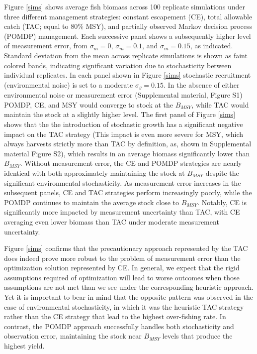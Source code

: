 \documentclass[3p]{elsarticle} %
\begin{document}
Figure \ref{sims} shows average fish biomass across 100 replicate
simulations under three different management strategies: constant
escapement (CE), total allowable catch (TAC; equal to 80\% MSY), and
partially observed Markov decision process (POMDP) management. Each
successive panel shows a subsequently higher level of measurement error,
from \(\sigma_m = 0\), \(\sigma_m = 0.1\), and \(\sigma_m = 0.15\), as
indicated. Standard deviation from the mean across replicate simulations
is shown as faint colored bands, indicating significant variation due to
stochasticity between individual replicates. In each panel shown in
Figure \ref{sims} stochastic recruitment (environmental noise) is set to
a moderate \(\sigma_g = 0.15\). In the absence of either environmental
noise or measurement error (Supplemental material, Figure S1) POMDP, CE,
and MSY would converge to stock at the \(B_{MSY}\), while TAC would
maintain the stock at a slightly higher level. The first panel of Figure
\ref{sims} shows that the the introduction of stochastic growth has a
significant negative impact on the TAC strategy (This impact is even
more severe for MSY, which always harvests strictly more than TAC by
definition, as, shown in Supplemental material Figure S2), which results
in an average biomass significantly lower than \(B_{MSY}\). Without
measurement error, the CE and POMDP strategies are nearly identical with
both approximately maintaining the stock at \(B_{MSY}\) despite the
significant environmental stochasticity. As measurement error increases
in the subsequent panels, CE and TAC strategies perform increasingly
poorly, while the POMDP continues to maintain the average stock close to
\(B_{MSY}\). Notably, CE is significantly more impacted by measurement
uncertainty than TAC, with CE averaging even lower biomass than TAC
under moderate measurement uncertainty.

Figure \ref{sims} confirms that the precautionary approach represented
by the TAC does indeed prove more robust to the problem of measurement
error than the optimization solution represented by CE. In general, we
expect that the rigid assumptions required of optimization will lead to
worse outcomes when those assumptions are not met than we see under the
corresponding heuristic approach. Yet it is important to bear in mind
that the opposite pattern was observed in the case of environmental
stochasticity, in which it was the heuristic TAC strategy rather than
the CE strategy that lead to the highest over-fishing rate. In contrast,
the POMDP approach successfully handles both stochasticity and
observation error, maintaining the stock near \(B_{MSY}\) levels that
produce the highest yield.
\end{document}

